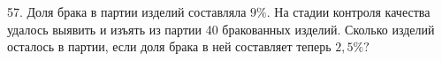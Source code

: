 57. Доля брака в партии изделий составляла $9\%.$ На стадии контроля качества удалось выявить и изъять из партии 40 бракованных изделий. Сколько изделий осталось в партии, если доля брака в ней составляет теперь $2,5\%?$\\
